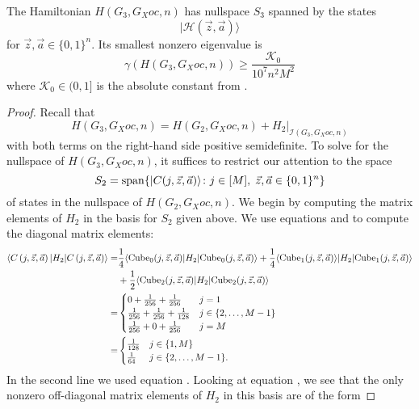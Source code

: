 \documentclass[../thesis-main/thesis-main]{subfiles}
\begin{document}
\begin{lemma}
\label{lem:HG3}
The Hamiltonian $H(G_{3},G_Xoc,n)$ has nullspace $S_3$ spanned by the states
\[
  |\mathcal{H}(\vec{z},\vec{a})\rangle
\]
for $\vec{z},\vec{a}\in\{0,1\}^{n}$. Its smallest nonzero eigenvalue is 
\[
  \gamma(H(G_{3},G_Xoc,n)) \geq \frac{\mathcal{K}_0}{10^7 n^{2}M^{2}}
\]
where $\mathcal{K}_0\in (0,1]$ is the absolute constant from .
\end{lemma}

\begin{proof}
Recall that
\[
H(G_{3},G_Xoc,n)=H(G_{2},G_Xoc,n)+H_{2}|_{\mathcal{I}(G_{3},G_Xoc,n)}
\]
with both terms on the right-hand side positive semidefinite. To solve for the nullspace of $H(G_{3},G_Xoc,n)$, it suffices to restrict our attention to the space
\begin{equation}
  S_{2}=\operatorname{span}\{ |C(j,\vec{z},\vec{a})\rangle\colon
    j\in[M],\;\vec{z},\vec{a}\in\{0,1\}^{n}\}
  \label{eq:S_beta_basis}
\end{equation}
of states in the nullspace of $H(G_{2},G_Xoc,n)$. We begin by computing the matrix elements of $H_{2}$ in the basis for $S_{2}$ given above. We use equations  and  to compute the diagonal matrix elements: 
\begin{align}
\langle C\left(j,\vec{z},\vec{a}\right)|H_{2}|C\left(j,\vec{z},\vec{a}\right)\rangle= & \frac{1}{4}\langle{\operatorname{Cube}_{0}(j,\vec{z},\vec{a})}|H_{2}|{\operatorname{Cube}_{0}(j,\vec{z},\vec{a})}\rangle+\frac{1}{4}\langle{\operatorname{Cube}_{1}(j,\vec{z},\vec{a})}\rangle|H_{2}|{\operatorname{Cube}_{1}(j,\vec{z},\vec{a})}\rangle\\
 & +\frac{1}{2}\langle{\operatorname{Cube}_{2}(j,\vec{z},\vec{a})}|H_{2}|{\operatorname{Cube}_{2}(j,\vec{z},\vec{a})}\rangle\\
= & \begin{cases}
0+\frac{1}{256}+\frac{1}{256} & j=1\\
\frac{1}{256}+\frac{1}{256}+\frac{1}{128} & j\in\{2,\ldots,M-1\}\\
\frac{1}{256}+0+\frac{1}{256} & j=M
\end{cases}\\
= & \begin{cases}
\frac{1}{128} & j\in\{1,M\} \\
\frac{1}{64} & j\in\{2,\ldots,M-1\}.
\end{cases}\label{eq:diag_C_mat_els}
\end{align}
In the second line we used equation . Looking at equation , we see that the only nonzero off-diagonal matrix elements of $H_{2}$ in this basis are of the form 

\end{proof}
\end{document}
